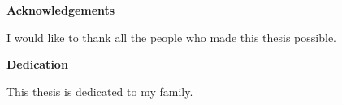 \begin{center}\textbf{Acknowledgements}\end{center}

I would like to thank all the people who made this thesis possible.
\cleardoublepage


\begin{center}\textbf{Dedication}\end{center}

This thesis is dedicated to my family.
\cleardoublepage

\renewcommand\contentsname{Table of Contents}
\tableofcontents
\cleardoublepage
{}    %

\listoftables
\cleardoublepage
{}		%

\listoffigures
\cleardoublepage
{}		%

\cleardoublepage
{}		%


